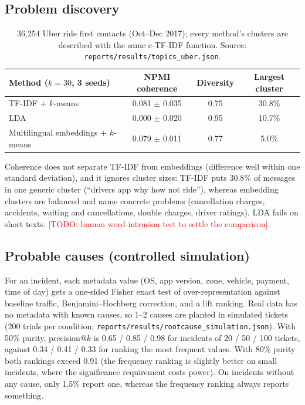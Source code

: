 \documentclass[11pt,a4paper]{article}
\newcommand{\todo}[1]{\textcolor{red}{[TODO: #1]}}
\newcommand{\res}[1]{\texttt{\small reports/results/#1}}
\begin{document}
\subsection{Problem discovery}
\begin{table}[h]
\centering\small
\begin{tabular}{lccc}
\toprule
Method ($k=30$, 3 seeds) & NPMI coherence & Diversity & Largest cluster \\
\midrule
TF-IDF + $k$-means & 0.081 $\pm$ 0.035 & 0.75 & 30.8\% \\
LDA & 0.000 $\pm$ 0.020 & 0.95 & 10.7\% \\
Multilingual embeddings + $k$-means & 0.079 $\pm$ 0.011 & 0.77 & 5.0\% \\
\bottomrule
\end{tabular}
\caption{36{,}254 Uber ride first contacts (Oct--Dec 2017); every method's clusters are described
with the same c-TF-IDF function. Source: \res{topics\_uber.json}.}
\end{table}
Coherence does not separate TF-IDF from embeddings (difference well within one standard deviation),
and it ignores cluster sizes: TF-IDF puts 30.8\% of messages in one generic cluster (``drivers app
why how not ride''), whereas embedding clusters are balanced and name concrete problems
(cancellation charges, accidents, waiting and cancellations, double charges, driver ratings). LDA fails
on short texts. \todo{human word-intrusion test to settle the comparison}.

\subsection{Probable causes (controlled simulation)}
For an incident, each metadata value (OS, app version, zone, vehicle, payment, time of day) gets a
one-sided Fisher exact test of over-representation against baseline traffic, Benjamini--Hochberg
correction, and a lift ranking. Real data has no metadata with known causes, so 1--2 causes are
planted in simulated tickets (200 trials per condition; \res{rootcause\_simulation.json}).
With 50\% purity, precision@$k$ is 0.65 / 0.85 / 0.98 for incidents of 20 / 50 / 100 tickets, against
0.34 / 0.41 / 0.33 for ranking the most frequent values. With 80\% purity both rankings exceed 0.91 (the
frequency ranking is slightly better on small incidents, where the significance requirement costs
power). On incidents without any cause, only 1.5\% report one, whereas the frequency ranking always
reports something.
\end{document}
